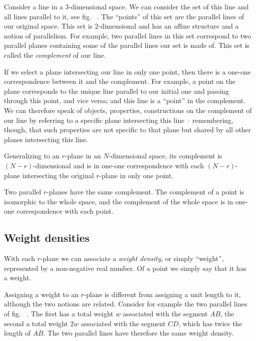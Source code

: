 \documentclass[\ifafour a4paper,12pt,\else a5paper,10pt,\fi%
onecolumn,oneside,article,%
british%
]{memoir}
\theoremstyle{remark}
\theoremstyle{innote}
\renewcommand*{\|}{\nonscript\,\vert\nonscript\;\mathopen{}}
\newcommand*{\fig}{fig.}%
\newcommand*{\puzzle}{{\fontencoding{U}\fontfamily{fontawesometwo}\selectfont\symbol{225}}}
\newcommand{\mynote}[1]{ {\color{notecolour}\puzzle\ #1}}
\newcommand*{\yr}{r}
\newcommand*{\yN}{N}
\newcommand*{\yw}{w}
\begin{document}
Consider a line in a 3-dimensional space. We can consider the set of this
line and all lines parallel to it, see \fig\mynote{}. The \enquote{points} of
this set are the parallel lines of our original space. This set is
2-dimensional and has an affine structure and a notion of parallelism. For
example, two parallel lines in this set correspond to two parallel planes
containing some of the parallel lines our set is made of. This set is
called the \emph{complement} of our line.

If we select a plane intersecting our line in only one point, then there is
a one-one correspondence between it and the complement. For example, a
point on the plane corresponds to the unique line parallel to our initial
one and passing through this point, and vice versa; and this line is a
\enquote{point} in the complement. We can therefore speak of objects,
properties, constructions on the complement of our line by referring to a
specific plane intersecting this line -- remembering, though, that such
properties are not specific to that plane but shared by all other planes
intersecting this line.

Generalizing to an $\yr$-plane in an $\yN$-dimensional space, its
complement is $(\yN-\yr)$-dimensional and is in one-one correspondence with
each $(\yN-\yr)$-plane intersecting the original $\yr$-plane in only one
point.

Two parallel $\yr$-planes have the same complement. The complement of a
point is isomorphic to the whole space, and the complement of the whole
space is in one-one correspondence with each point.




\subsection{Weight densities}
\label{sec:weight_densities}

With each $\yr$-plane we can associate a \emph{weight density}, or simply
\enquote{weight}, represented by a non-negative real number. Of a point we
simply say that it has a weight.

Assigning a weight to an $\yr$-plane is different from assigning a unit
length to it, although the two notions are related. Consider for example
the two parallel lines of \fig\mynote{}. The first has a total weight $\yw$
associated with the segment $AB$, the second a total weight $2\yw$
associated with the segment $CD$, which has twice the length of $AB$. The two
parallel lines have therefore the same weight density.
\end{document}
